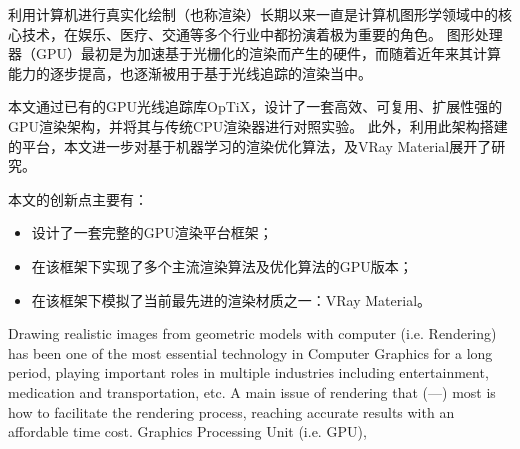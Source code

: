 \begin{cabstract}
  利用计算机进行真实化绘制（也称渲染）长期以来一直是计算机图形学领域中的核心技术，在娱乐、医疗、交通等多个行业中都扮演着极为重要的角色。
  图形处理器（GPU）最初是为加速基于光栅化的渲染而产生的硬件，而随着近年来其计算能力的逐步提高，也逐渐被用于基于光线追踪的渲染当中。

  本文通过已有的GPU光线追踪库OpTiX，设计了一套高效、可复用、扩展性强的GPU渲染架构，并将其与传统CPU渲染器进行对照实验。
  此外，利用此架构搭建的平台，本文进一步对基于机器学习的渲染优化算法，及VRay Material展开了研究。

  本文的创新点主要有：
  \begin{itemize}
    \item 设计了一套完整的GPU渲染平台框架；
    \item 在该框架下实现了多个主流渲染算法及优化算法的GPU版本；
    \item 在该框架下模拟了当前最先进的渲染材质之一：VRay Material。
  \end{itemize}

\end{cabstract}


\begin{eabstract}
   Drawing realistic images from geometric models with computer (i.e. Rendering) has been one of the most essential technology in Computer Graphics for a long period, 
   playing important roles in multiple industries including entertainment, medication and transportation, etc.
   A main issue of rendering that (---) most is how to facilitate the rendering process, reaching accurate results with an affordable time cost. 
   Graphics Processing Unit (i.e. GPU), 
\end{eabstract}

